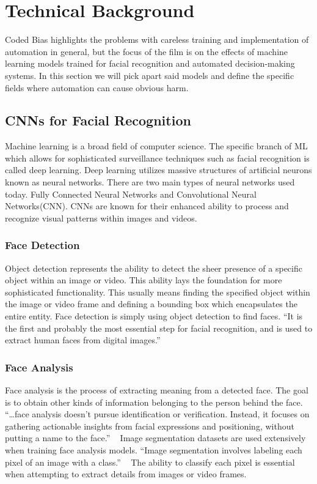 \documentclass[sigconf, 10pt]{acmart}
\begin{document}
\section{Technical Background}
Coded Bias highlights the problems with careless training and implementation of automation in general, but the focus of the film is on the effects of machine learning models trained for facial recognition and automated decision-making systems. In this section we will pick apart said models and define the specific fields where automation can cause obvious harm.
\subsection{CNNs for Facial Recognition}
Machine learning is a broad field of computer science. The specific branch of ML which allows for sophisticated surveillance techniques such as facial recognition is called deep learning. Deep learning utilizes massive structures of artificial neurons known as neural networks. There are two main types of neural networks used today. Fully Connected Neural Networks and Convolutional Neural Networks(CNN). CNNs are known for their enhanced ability to process and recognize visual patterns within images and videos.
\subsubsection{Face Detection}
Object detection represents the ability to detect the sheer presence of a specific object within an image or video. This ability lays the foundation for more sophisticated functionality. This usually means finding the specified object within the image or video frame and defining a bounding box which encapsulates the entire entity. Face detection is simply using object detection to find faces. “It is the first and probably the most essential step for facial recognition, and is used to extract human faces from digital images.” ~\cite{used_eleventh(10)}
\subsubsection{Face Analysis}
Face analysis is the process of extracting meaning from a detected face. The goal is to obtain other kinds of information belonging to the person behind the face. “…face analysis doesn’t pursue identification or verification. Instead, it focuses on gathering actionable insights from facial expressions and positioning, without putting a name to the face.” ~\cite{used_third(2)} Image segmentation datasets are used extensively when training face analysis models. “Image segmentation involves labeling each pixel of an image with a class.” ~\cite{used_fourth(3)} The ability to classify each pixel is essential when attempting to extract details from images or video frames.
\end{document}
